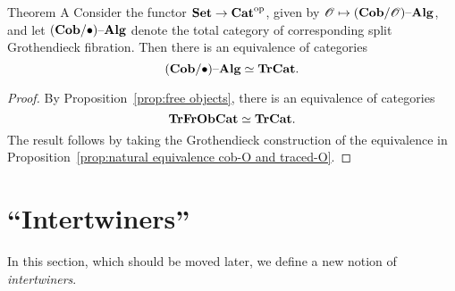 \documentclass[12pt,oneside,article,draft]{memoir}
\begin{document}
%
%
%
\begin{named}{Theorem A}\label{thm:Theorem A}
   Consider the functor $\mathbf{Set}\to{\mathbf{Cat}}^{\text{op}}$, given by $\mathscr{O}\mapsto(\mathbf{Cob}/\mathscr{O}){\text \textendash}\mathbf{Alg}$, and let $(\mathbf{Cob}/\bullet){\text \textendash}\mathbf{Alg}$ denote the total category of corresponding split Grothendieck fibration.
   Then there is an equivalence of categories
      $$(\mathbf{Cob}/\bullet){\text \textendash}\mathbf{Alg}\simeq\mathbf{TrCat}.$$
\end{named}
\begin{proof}
   By Proposition~\ref{prop:free objects}, there is an equivalence of categories
      $$\mathbf{TrFrObCat}\simeq\mathbf{TrCat}.$$
   The result follows by taking the Grothendieck construction of the equivalence in Proposition~\ref{prop:natural equivalence cob-O and traced-O}.
\end{proof}


\chapter{``Intertwiners''}

In this section, which should be moved later, we define a new notion of \emph{intertwiners}.
\end{document}
